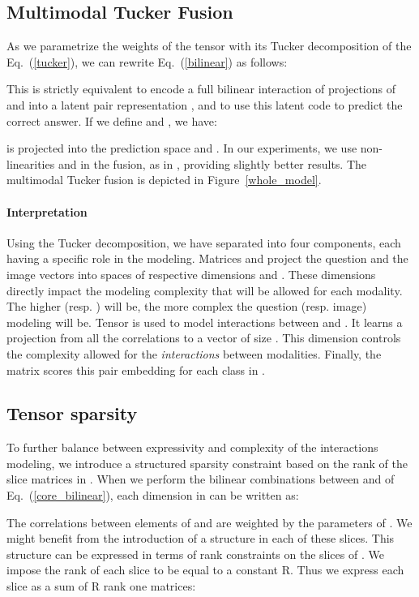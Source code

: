 \documentclass[10pt,twocolumn,letterpaper]{article}
\begin{document}
\subsection{Multimodal Tucker Fusion} \label{mtf}
As we parametrize the weights of the tensor  with its Tucker decomposition of the Eq.~(\ref{tucker}), we can rewrite Eq.~(\ref{bilinear}) as follows:

This is strictly equivalent to encode a full bilinear interaction of projections of  and  into a latent pair representation , and to use this latent code to predict the correct answer. If we define  and , we have:

 is projected into the prediction space  and . In our experiments, we use non-linearities  and  in the fusion, as in \cite{Kim2017}, providing slightly better results. The multimodal Tucker fusion is depicted in Figure~\ref{whole_model}.

\paragraph{Interpretation}
Using the Tucker decomposition, we have separated  into four components, each having a specific role in the modeling. Matrices  and  project the question and the image vectors into spaces of respective dimensions  and . These dimensions directly impact the modeling complexity that will be allowed for each modality. The higher  (resp. ) will be, the more complex the question (resp. image) modeling will be. Tensor  is used to model interactions between  and . It learns a projection from all the correlations  to a vector  of size . This dimension controls the complexity allowed for the \emph{interactions} between modalities. Finally, the matrix  scores this pair embedding  
for each class in .

\subsection{Tensor sparsity} \label{section:ssparsity}
To further balance between expressivity and complexity of the interactions modeling, we introduce a structured sparsity constraint based on the rank of the slice matrices in .
When we perform the  bilinear combinations between  and  of Eq.~(\ref{core_bilinear}), each dimension  in  can be written as:

The correlations between elements of  and  are weighted by the  parameters of . We might benefit from the introduction of a structure in each of these slices. This structure can be expressed in terms of rank constraints on the slices of . We impose the rank of each slice to be equal to a constant R. Thus we express each slice  as a sum of R rank one matrices:
\end{document}
